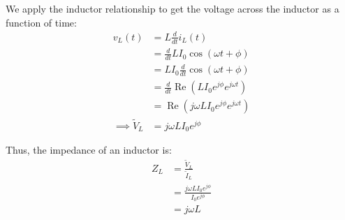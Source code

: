 \begin{enumerate}
{    We apply the inductor relationship to get the voltage across the inductor as a function of time:
    \begin{align*}
        v_L(t) &= L \frac{d}{dt} i_L(t) \\
        &= \frac{d}{dt} L I_0 \cos(\omega t + \phi) \\
        &= LI_0 \frac{d}{dt} \cos(\omega t + \phi) \\
        &= \frac{d}{dt} \operatorname{Re}(L I_0 e^{j \phi} e^{j \omega t}) \\
        &= \operatorname{Re}(j \omega L I_0 e^{j \phi} e^{j \omega t}) \\
        \implies \widetilde{V}_L &= j \omega L I_0 e^{j \phi}
    \end{align*}

    Thus, the impedance of an inductor is:
    \begin{align*}
        Z_L &= \frac{\widetilde{V}_L}{\widetilde{I}_L} \\
        &= \frac{j \omega L I_0 e^{j \phi}}{I_0 e^{j \phi}} \\
        &= j\omega L
    \end{align*}
}

\end{enumerate}







